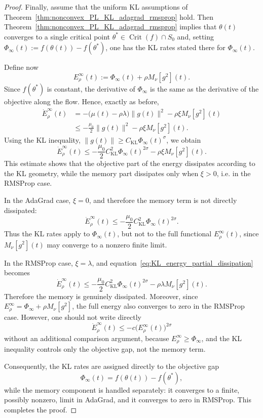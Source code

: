 \documentclass{article} %
\begin{document}
\begin{proof}
Finally, assume that the uniform KL assumptions of Theorem~\ref{thm:nonconvex_PL_KL_adagrad_rmsprop} hold. Then Theorem~\ref{thm:nonconvex_PL_KL_adagrad_rmsprop} implies that
\(\theta(t)\) converges to a single critical point $\theta^*\in\operatorname{Crit}(f)\cap S_0$ and, setting $\Phi_\infty(t):=f(\theta(t))-f(\theta^*)$, one has the KL rates stated there for \(\Phi_\infty(t)\). 

Define now
\[
    E_\rho^\infty(t)
    :=
    \Phi_\infty(t)+\rho M_\nu[g^2](t).
\]
Since \(f(\theta^*)\) is constant, the derivative of \(\Phi_\infty\) is the same as the derivative of the objective along the flow. Hence, exactly as before,
\[
\begin{aligned}
    \dot E_\rho^\infty(t)
    &=
    -\bigl(\mu(t)-\rho\lambda\bigr)\|g(t)\|^2
    -
    \rho\xi M_\nu[g^2](t)\\
    &\leq
    -
    \frac{\mu_0}{2}\|g(t)\|^2
    -
    \rho\xi M_\nu[g^2](t).
\end{aligned}
\]
Using the KL inequality, $\|g(t)\|\geq C_{\mathrm{KL}}\Phi_\infty(t)^\sigma$, we obtain
\begin{equation}
\label{eq:KL_energy_partial_dissipation}
    \dot E_\rho^\infty(t)
    \leq
    -
    \frac{\mu_0}{2}C_{\mathrm{KL}}^2
    \Phi_\infty(t)^{2\sigma}
    -
    \rho\xi M_\nu[g^2](t).
\end{equation}
This estimate shows that the objective part of the energy dissipates according to the KL geometry, while the memory part dissipates only when \(\xi>0\), i.e. in the RMSProp case.

In the AdaGrad case, \(\xi=0\), and therefore the memory term is not directly dissipated:
\[
    \dot E_\rho^\infty(t)
    \leq
    -
    \frac{\mu_0}{2}C_{\mathrm{KL}}^2
    \Phi_\infty(t)^{2\sigma}.
\]
Thus the KL rates apply to \(\Phi_\infty(t)\), but not to the full functional
\(E_\rho^\infty(t)\), since \(M_\nu[g^2](t)\) may converge to a nonzero finite limit.

In the RMSProp case, \(\xi=\lambda\), and equation~\ref{eq:KL_energy_partial_dissipation} becomes
\[
    \dot E_\rho^\infty(t)
    \leq
    -
    \frac{\mu_0}{2}C_{\mathrm{KL}}^2
    \Phi_\infty(t)^{2\sigma}
    -
    \rho\lambda M_\nu[g^2](t).
\]
Therefore the memory is genuinely dissipated. Moreover, since \(E_\rho^\infty=\Phi_\infty+\rho M_\nu[g^2]\), the full energy also converges to zero in the RMSProp case. However, one should not write directly
\[
    \dot E_\rho^\infty(t)
    \leq
    -c\bigl(E_\rho^\infty(t)\bigr)^{2\sigma}
\]
without an additional comparison argument, because \(E_\rho^\infty\geq\Phi_\infty\), and the KL inequality controls only the objective gap, not the memory term.

Consequently, the KL rates are assigned directly to the objective gap
\[
    \Phi_\infty(t)=f(\theta(t))-f(\theta^*),
\]
while the memory component is handled separately: it converges to a finite, possibly nonzero, limit in AdaGrad, and it converges to zero in RMSProp. This completes the proof.
\end{proof}
\end{document}

